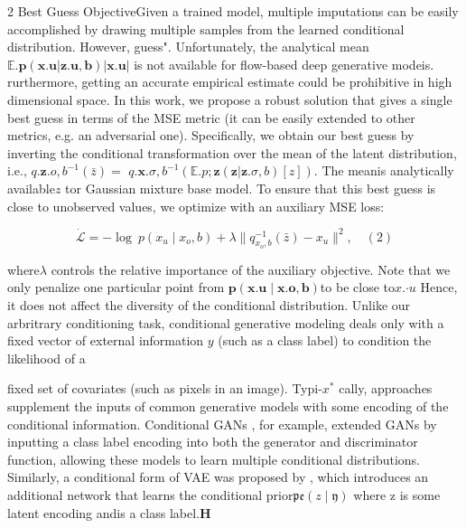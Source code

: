 \documentclass{article}
\begin{document}
\begin{paracol}{2}
Best Guess ObjectiveGiven a trained model, multiple imputations can be easily accomplished by drawing multiple
samples from the learned conditional distribution. However,
guess". Unfortunately, the analytical mean$\mathbb { E } . { \mathbf { p ( x . { u } | z . { u }, b ) } } | \pmb { x . { u } } |$
is not available for flow-based deep generative modeis. rurthermore, getting an accurate empirical estimate could be
prohibitive in high dimensional space. In this work, we
propose a robust solution that gives a single best guess
in terms of the MSE metric (it can be easily extended to
other metrics, e.g. an adversarial one). Specifically, we obtain our best guess by inverting the conditional transformation over the mean of the latent distribution, i.e., $q . { \pmb z . { o }, b } ^ { - 1 } ( \bar { z } ) =$
$q . { \pmb { x } . { \sigma }, b } ^ { - 1 } ( \mathbb { E } . { p ; \pmb { z } ( \pmb { z } | \mathbf { z } . { \sigma }, b ) } [ z ] ).$ The meanis analytically available$z$
tor Gaussian mixture base model. To ensure that this best
guess is close to unobserved values, we optimize with an
auxiliary MSE loss:


\begin{equation}
\dot { \mathcal { L } } = - \log ~ p ( x _ { u } \mid x _ { o }, b ) + \lambda \| q _ { x _ { o }, b } ^ { - 1 } ( \bar { z } ) - x _ { u } \| ^ { 2 }, \quad ( 2 )
\end{equation}


where$\lambda$ controls the relative importance of the auxiliary
objective. Note that we only penalize one particular point
from $\pmb { p } ( \pmb { x . { u } } \mid \pmb { x . { o } }, \pmb { b } )$to be close to$x . { \cdot u }$ Hence, it does not affect the diversity of the conditional distribution. Unlike our
arbritrary conditioning task, conditional generative modeling deals only with a fixed vector of external information
$y$ (such as a class label) to condition the likelihood of a

\switchcolumn
\RaggedRight

fixed set of covariates (such as pixels in an image). Typi-$x ^ { * }$
cally, approaches supplement the inputs of common generative models with some encoding of the conditional information. Conditional GANs , for example, extended GANs by
inputting a class label encoding into both the generator and
discriminator function, allowing these models to learn multiple conditional distributions. Similarly, a conditional form
of VAE was proposed by , which introduces an additional
network that learns the conditional prior${ \mathfrak { p e } } ( z \mid { \mathfrak { y } } )$ where z
is some latent encoding andis a class label.$\boldsymbol { H }$



\end{paracol}
\end{document}
